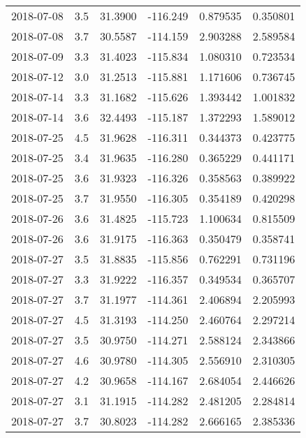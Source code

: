\begin{tabular}{lrrrrr}
2018-07-08 &       3.5 &  31.3900 &  -116.249 &         0.879535 &         0.350801 \\
2018-07-08 &       3.7 &  30.5587 &  -114.159 &         2.903288 &         2.589584 \\
2018-07-09 &       3.3 &  31.4023 &  -115.834 &         1.080310 &         0.723534 \\
2018-07-12 &       3.0 &  31.2513 &  -115.881 &         1.171606 &         0.736745 \\
2018-07-14 &       3.3 &  31.1682 &  -115.626 &         1.393442 &         1.001832 \\
2018-07-14 &       3.6 &  32.4493 &  -115.187 &         1.372293 &         1.589012 \\
2018-07-25 &       4.5 &  31.9628 &  -116.311 &         0.344373 &         0.423775 \\
2018-07-25 &       3.4 &  31.9635 &  -116.280 &         0.365229 &         0.441171 \\
2018-07-25 &       3.6 &  31.9323 &  -116.326 &         0.358563 &         0.389922 \\
2018-07-25 &       3.7 &  31.9550 &  -116.305 &         0.354189 &         0.420298 \\
2018-07-26 &       3.6 &  31.4825 &  -115.723 &         1.100634 &         0.815509 \\
2018-07-26 &       3.6 &  31.9175 &  -116.363 &         0.350479 &         0.358741 \\
2018-07-27 &       3.5 &  31.8835 &  -115.856 &         0.762291 &         0.731196 \\
2018-07-27 &       3.3 &  31.9222 &  -116.357 &         0.349534 &         0.365707 \\
2018-07-27 &       3.7 &  31.1977 &  -114.361 &         2.406894 &         2.205993 \\
2018-07-27 &       4.5 &  31.3193 &  -114.250 &         2.460764 &         2.297214 \\
2018-07-27 &       3.5 &  30.9750 &  -114.271 &         2.588124 &         2.343866 \\
2018-07-27 &       4.6 &  30.9780 &  -114.305 &         2.556910 &         2.310305 \\
2018-07-27 &       4.2 &  30.9658 &  -114.167 &         2.684054 &         2.446626 \\
2018-07-27 &       3.1 &  31.1915 &  -114.282 &         2.481205 &         2.284814 \\
2018-07-27 &       3.7 &  30.8023 &  -114.282 &         2.666165 &         2.385336 \\

\end{tabular}
